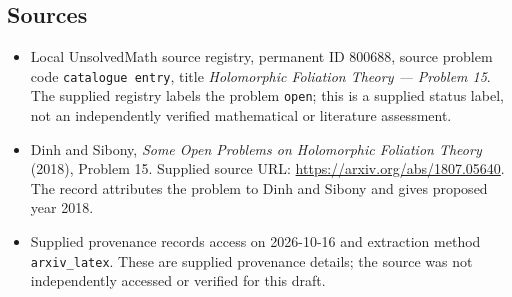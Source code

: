 \documentclass[11pt]{article}
\begin{document}
\subsection{Sources}
\begin{itemize}
\item Local UnsolvedMath source registry, permanent ID \(800688\), source problem code \texttt{catalogue entry}, title \emph{Holomorphic Foliation Theory --- Problem 15}. The supplied registry labels the problem \texttt{open}; this is a supplied status label, not an independently verified mathematical or literature assessment.
\item Dinh and Sibony, \emph{Some Open Problems on Holomorphic Foliation Theory} (2018), Problem 15. Supplied source URL: \url{https://arxiv.org/abs/1807.05640}. The record attributes the problem to Dinh and Sibony and gives proposed year 2018.
\item Supplied provenance records access on 2026-10-16 and extraction method \texttt{arxiv\_latex}. These are supplied provenance details; the source was not independently accessed or verified for this draft.
\end{itemize}
\end{document}

